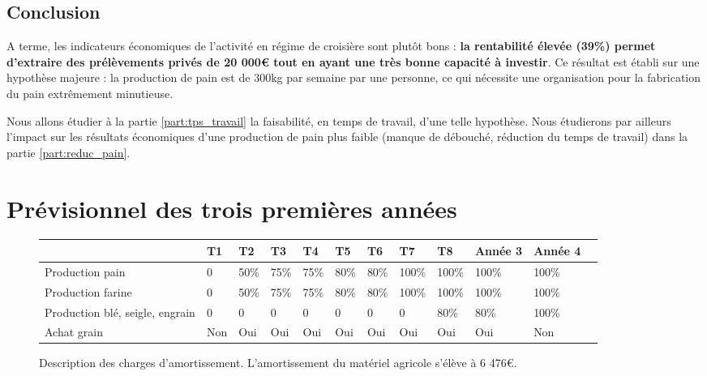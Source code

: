 \documentclass{book}
\begin{document}
\noindent{}

\subsection{Conclusion}

A terme, les indicateurs économiques de l'activité en régime de croisière sont plutôt bons : \textbf{la rentabilité élevée (39\%) permet d'extraire des prélèvements privés de 20 000\euro{} tout en ayant une très bonne capacité à investir}. Ce résultat est établi sur une hypothèse majeure : la production de pain est de 300kg par semaine par une personne, ce qui nécessite une organisation pour la fabrication du pain extrêmement minutieuse. 

Nous allons étudier à la partie \ref{part:tps_travail} la faisabilité, en temps de travail, d'une telle hypothèse. Nous étudierons par ailleurs l'impact sur les résultats économiques d'une production de pain plus faible (manque de débouché, réduction du temps de travail) dans la partie \ref{part:reduc_pain}.

\section{Prévisionnel des trois premières années}
\label{part:previsionnel}

\begin{figure}[h!]
\footnotesize
\center
\begin{tabular}{ | p{} | p{}| p{}| p{}| p{}| p{}| p{}| p{}| p{}| p{1.2cm}| p{1.2cm}| }
\hline
	& T1 & T2 & T3 & T4 & T5 & T6 & T7 & T8 & Année 3 & Année 4 \  \\ \hline
	Production pain & 0 & 50\% & 75\% & 75\% & 80\% & 80\% & 100\% & 100\% & 100\% & 100\% \\ \hline
	Production farine & 0 & 50\% & 75\% & 75\% & 80\% & 80\% & 100\% & 100\% & 100\% & 100\% \\ \hline
	Production blé, seigle, engrain & 0 & 0 & 0 & 0 & 0 & 0 & 0 & 80\% & 80\% & 100\% \\ \hline
	Achat grain & Non & Oui & Oui & Oui & Oui & Oui & Oui & Oui & Oui & Non \\ \hline
\end{tabular}
\caption{Description des charges d'amortissement. L'amortissement du matériel agricole s'élève à 6 476\euro{}.}
\label{tab:amortissement}
\end{figure}
\end{document}
